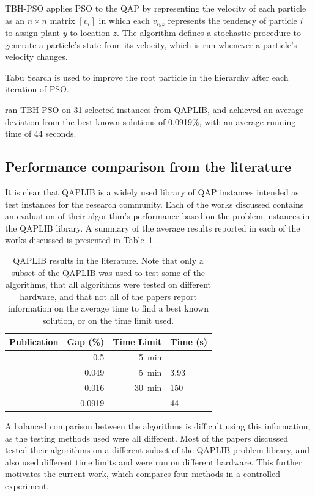 {{    	TBH-PSO applies PSO to the QAP by representing the velocity of each particle as an \(n \times n\) matrix \([v_{i}]\) in which each \(v_{iyz}\) represents the tendency of particle \(i\) to assign plant \(y\) to location \(z\).
    	The algorithm defines a stochastic procedure to generate a particle's state from its velocity, which is run whenever a particle's velocity changes.

    	Tabu Search is used to improve the root particle in the hierarchy after each iteration of PSO.

    	\citeauthor{Helal:2015de} ran TBH-PSO on 31 selected instances from QAPLIB, and achieved an average deviation from the best known solutions of 0.0919\%, with an average running time of 44 seconds.
    }
}

\subsection{Performance comparison from the literature} {
    It is clear that QAPLIB \citep{Burkard:1997ve} is a widely used library of QAP instances intended as test instances for the research community.
    Each of the works discussed contains an evaluation of their algorithm's performance based on the problem instances in the QAPLIB library.
    A summary of the average results reported in each of the works discussed is presented in Table~\ref{tab:literature-results}.

    \begin{table}[h]
        \centering
        \begin{tabularx}{0.68\textwidth}{@{}l|rrX@{}}
            \toprule
            Publication & Gap (\%) & Time Limit & Time (s) \\
            \midrule
            \citep{Misevicius:2012dj} & 0.5 & \SI{5}{\minute} &  \\
            \citep{Harris:2015kw} & 0.049 & \SI{5}{\minute} & 3.93 \\
            \citep{Benlic:2015gp} & 0.016 & \SI{30}{\minute} & 150 \\
            \citep{Helal:2015de} & 0.0919 & & 44 \\
            \bottomrule
        \end{tabularx}
        \caption{QAPLIB results in the literature. Note that only a subset of the QAPLIB was used to test some of the algorithms, that all algorithms were tested on different hardware, and that not all of the papers report information on the average time to find a best known solution, or on the time limit used.}
        \label{tab:literature-results}
    \end{table}

    A balanced comparison between the algorithms is difficult using this information, as the testing methods used were all different.
    Most of the papers discussed tested their algorithms on a different subset of the QAPLIB problem library, and also used different time limits and were run on different hardware.
    This further motivates the current work, which compares four methods in a controlled experiment.
}

